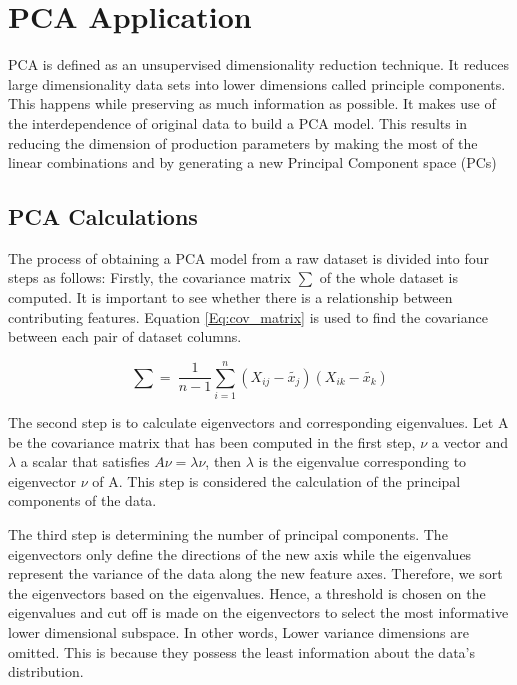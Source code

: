 \section{\ac{PCA} Application }
\ac{PCA} is defined as an unsupervised dimensionality reduction technique. It reduces large dimensionality data sets into lower dimensions called principle components. This happens while preserving as much information as possible. It makes use of the interdependence of original data to build a \ac{PCA} model. This results in reducing the dimension of production parameters by making the most of the linear combinations and by generating a new Principal Component space (PCs)

\subsection{\ac{PCA} Calculations}
The process of obtaining a \ac{PCA} model from a raw dataset is divided into four steps as follows:
Firstly, the covariance matrix $\sum$ of the whole dataset is computed. It is important to see whether there is a relationship between contributing features. Equation \ref{Eq:cov_matrix} is used to find the covariance between each pair of dataset columns. 

\begin{equation}\label{Eq:cov_matrix}
    \sum =\ \frac{1}{n-1}\sum_{i=1}^{n}{(X_{ij}-\widetilde{x_j})(X_{ik}-\widetilde{x_k})}
\end{equation}

The second step is to calculate eigenvectors and corresponding eigenvalues. Let A be the covariance matrix that has been computed in the first step, $\nu$ a vector and $\lambda$ a scalar that satisfies $A\nu=\lambda\nu$, then $\lambda$ is the eigenvalue corresponding to eigenvector $\nu$ of A. This step is considered the calculation of the principal components of the data.

The third step is determining the number of principal components. The eigenvectors only define the directions of the new axis while the eigenvalues represent the variance of the data along the new feature axes. Therefore, we sort the eigenvectors based on the eigenvalues. Hence, a threshold is chosen on the eigenvalues and cut off is made on the eigenvectors to select the most informative lower dimensional subspace. In other words, Lower variance dimensions are omitted. This is because they possess the least information about the data’s distribution.

